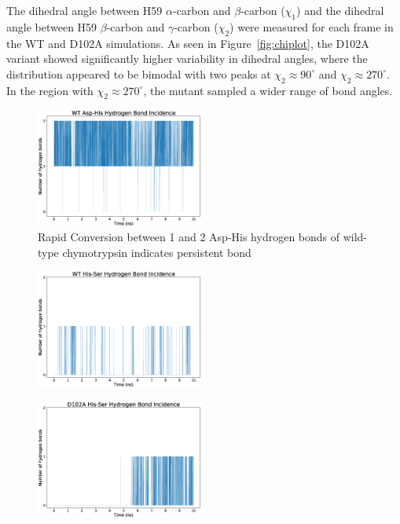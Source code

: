 \documentclass[12pt, twocolumn]{article}
\begin{document}
The dihedral angle between H59 \(\alpha\)-carbon and \(\beta\)-carbon
(\(\chi_1\)) and the dihedral angle between H59 \(\beta\)-carbon and
\(\gamma\)-carbon (\(\chi_2\)) were measured for each frame in the WT and
D102A simulations. As seen in Figure~\ref{fig:chiplot}, the D102A variant
showed significantly higher variability in dihedral angles, where the
distribution appeared to be bimodal with two peaks at
\(\chi_2 \approx 90^\circ\) and \(\chi_2 \approx 270^\circ\). In
the region with \(\chi_2 \approx 270^\circ\), the mutant sampled a wider
range of bond angles.


\begin{figure}[H]
    \centering
        \includegraphics[width=0.49\textwidth]{wt_hbonds_asp_his.eps}
    \caption{Rapid Conversion between 1 and 2 Asp-His hydrogen bonds
        of wild-type chymotrypsin indicates persistent bond}
\end{figure}


\begin{figure}[H]
    \centering
        \includegraphics[width=0.49\textwidth]{wt_hbonds_his_ser.eps}
    \caption{}
\end{figure}

\begin{figure}[H]
    \centering
        \includegraphics[width=0.49\textwidth]{d102a_hbonds_his_ser.eps}
    \caption{}
\end{figure}
\end{document}
